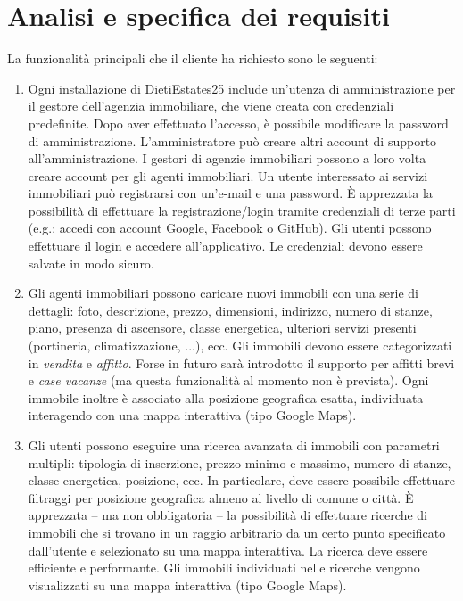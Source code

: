 \documentclass{article}
\begin{document}
\section{Analisi e specifica dei requisiti}
\label{sec:descrizione}
La funzionalit\`a principali che il cliente ha richiesto sono le seguenti:

\begin{enumerate}

    \item Ogni installazione di DietiEstates25 include un'utenza di amministrazione per il gestore dell'agenzia immobiliare, che viene creata con credenziali predefinite. Dopo aver effettuato l'accesso, \`e possibile modificare la password di amministrazione. L'amministratore pu\`o creare altri account di supporto all'amministrazione. I gestori di agenzie immobiliari possono a loro volta creare account per gli agenti immobiliari. Un utente interessato ai servizi immobiliari pu\`o registrarsi con un'e-mail e una password. \`E apprezzata la possibilit\`a di effettuare la registrazione/login tramite credenziali di terze parti (e.g.: accedi con account Google, Facebook o GitHub). Gli utenti possono effettuare il login e accedere all'applicativo. Le credenziali devono essere salvate in modo sicuro.

    \item Gli agenti immobiliari possono caricare nuovi immobili con una serie di dettagli: foto, descrizione, prezzo, dimensioni, indirizzo, numero di stanze, piano, presenza di ascensore, classe energetica, ulteriori servizi presenti (portineria, climatizzazione, ...), ecc. Gli immobili devono essere categorizzati in \emph{vendita} e \emph{affitto}. Forse in futuro sar\`a introdotto il supporto per affitti brevi e \emph{case vacanze} (ma questa funzionalit\`a al momento non \`e prevista). Ogni immobile inoltre \`e associato alla posizione geografica esatta, individuata interagendo con una mappa interattiva (tipo Google Maps).

    \item Gli utenti possono eseguire una ricerca avanzata di immobili con parametri multipli: tipologia di inserzione, prezzo minimo e massimo, numero di stanze, classe energetica, posizione, ecc. In particolare, deve essere possibile effettuare filtraggi per posizione geografica almeno al livello di comune o citt\`a. \`E apprezzata -- ma non obbligatoria -- la possibilit\`a di effettuare ricerche di immobili che si trovano in un raggio arbitrario da un certo punto specificato dall'utente e selezionato su una mappa interattiva. La ricerca deve essere efficiente e performante. Gli immobili individuati nelle ricerche vengono visualizzati su una mappa interattiva (tipo Google Maps).


\end{enumerate}
\end{document}
